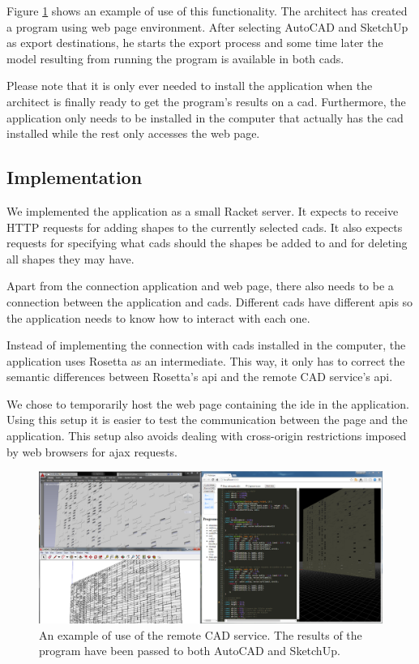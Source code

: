 Figure \ref{fig:remote:cad:example} shows an example of use of this functionality.
The architect has created a program using web page environment.
After selecting AutoCAD and SketchUp as export destinations, he starts the export process and some time later the model resulting from running the program is available in both \glspl{cad}.

Please note that it is only ever needed to install the application when the architect is finally ready to get the program's results on a \gls{cad}.
Furthermore, the application only needs to be installed in the computer that actually has the \gls{cad} installed while the rest only accesses the web page.


\subsection{Implementation}
We implemented the application as a small Racket server.
It expects to receive HTTP requests for adding shapes to the currently selected \glspl{cad}.
It also expects requests for specifying what \glspl{cad} should the shapes be added to and for deleting all shapes they may have.

Apart from the connection application and web page, there also needs to be a connection between the application and \glspl{cad}.
Different \glspl{cad} have different \glspl{api} so the application needs to know how to interact with each one.

Instead of implementing the connection with \glspl{cad} installed in the computer, the application uses Rosetta as an intermediate.
This way, it only has to correct the semantic differences between Rosetta's \gls{api} and the remote CAD service's \gls{api}.

We chose to temporarily host the web page containing the \gls{ide} in the application.
Using this setup it is easier to test the communication between the page and the application.
This setup also avoids dealing with cross-origin restrictions imposed by web browsers for \gls{ajax} requests.

\begin{figure}
  \centering
  \includegraphics[width=1.0\textwidth]{./images/remote_cad_example}
  \caption[An example of use of the remote CAD service.]{An example of use of the remote CAD service. The results of the program have been passed to both AutoCAD and SketchUp.}
  \label{fig:remote:cad:example}
\end{figure}


